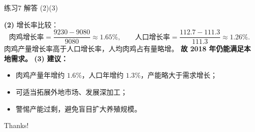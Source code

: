 \documentclass[10pt,aspectratio=169,serif]{beamer}
\begin{document}
\begin{frame}[t]{练习7 解答 (2)(3)}
\begin{tcolorbox}[colback=orange!10,colframe=orange,title=\textbf{解 (2)(3)}]
\textbf{(2)} 增长率比较：
\[
\text{肉鸡增长率}=\frac{9230-9080}{9080}\approx 1.65\%,\qquad
\text{人口增长率}=\frac{112.7-111.3}{111.3}\approx 1.26\%.
\]
肉鸡产量增长率高于人口增长率，人均肉鸡占有量略增。
\textbf{故 2018 年仍能满足本地需求。}
\smallskip
\textbf{(3) 建议：}
\begin{itemize}
  \item 肉鸡产量年增约 $1.6\%$，人口年增约 $1.3\%$，产能略大于需求增长；
  \item 可适当拓展外地市场、发展深加工；
  \item 警惕产能过剩，避免盲目扩大养殖规模。
\end{itemize}
\end{tcolorbox}
\end{frame}

\begin{frame}[c]
  \begin{center}
    {\Huge\calligra Thanks!}
  \end{center}
\end{frame}
\end{document}
